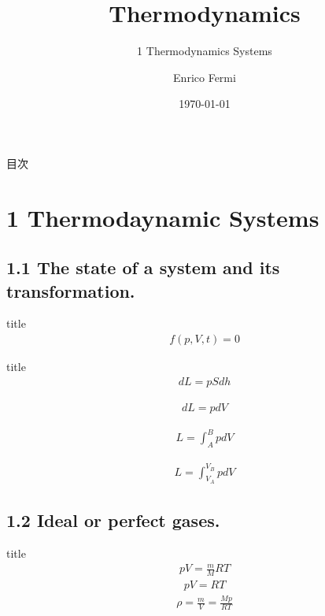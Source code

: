 \documentclass[dvipdfmx, 10pt, aspectratio = 169]{beamer}
\title{Thermodynamics}
\subtitle{1 Thermodynamics Systems}
\date{\today}
\author{Enrico Fermi}
\begin{document}
\begin{frame}
	\titlepage
\end{frame}

\begin{frame}{目次}
\tableofcontents
\end{frame}

\section{1 Thermodaynamic Systems}
\subsection{1.1 The state of a system and its transformation.}

\begin{frame}{title}
\begin{align}
	f(p, V, t) = 0
\end{align}
\end{frame}

\begin{frame}{title}
	\begin{align}
		dL = pSdh
	\end{align}
	
	\begin{align}
		dL = pdV
	\end{align}
	
	\begin{align}
		L = \int^B_A pdV
	\end{align}
	
	\begin{align}
		L = \int^{V_B}_{V_A} pdV
	\end{align}
\end{frame}

\subsection{1.2 Ideal or perfect gases.}

\begin{frame}{title}
	\begin{align}
		pV = \frac{m}{M}RT
	\end{align}
	\begin{align}
		pV = RT
	\end{align}
	\begin{align}
		\rho = \frac{m}{V} = \frac{Mp}{RT}
	\end{align}
\end{frame}
\end{document}
